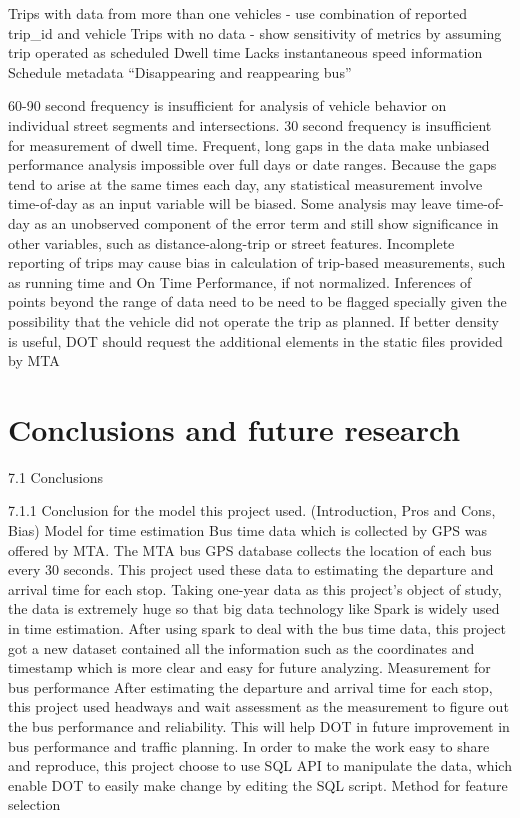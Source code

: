 \documentclass[12pt,journal,compsoc]{IEEEtran}
\begin{document}
Trips with data from more than one vehicles - use combination of reported trip\_id and vehicle
Trips with no data - show sensitivity of metrics by assuming trip operated as scheduled
Dwell time
Lacks instantaneous speed information
Schedule metadata
“Disappearing and reappearing bus” 

60-90 second frequency is insufficient for analysis of vehicle behavior on individual street segments and intersections.
30 second frequency is insufficient for measurement of dwell time.
Frequent, long gaps in the data make unbiased performance analysis impossible over full days or date ranges.  Because the gaps tend to arise at the same times each day, any statistical measurement involve time-of-day as an input variable will be biased.  Some analysis may leave time-of-day as an unobserved component of the error term and still show significance in other variables, such as distance-along-trip or street features.
Incomplete reporting of trips may cause bias in calculation of trip-based measurements, such as running time and On Time Performance, if not normalized.
Inferences of points beyond the range of data need to be need to be flagged specially given the possibility that the vehicle did not operate the trip as planned.
If better density is useful, DOT should request the additional elements in the static files provided by MTA


\section{Conclusions and future research}

7.1 Conclusions

7.1.1 Conclusion for the model this project used. (Introduction, Pros and Cons, Bias)
Model for time estimation
Bus time data which is collected by GPS was offered by MTA. The MTA bus GPS database collects the location of each bus every 30 seconds. This project used these data to estimating the departure and arrival time for each stop.
Taking one-year data as this project’s object of study, the data is extremely huge so that big data technology like Spark is widely used in time estimation.
After using spark to deal with the bus time data, this project got a new dataset contained all the information such as the coordinates and timestamp which is more clear and easy for future analyzing.
Measurement for bus performance
After estimating the departure and arrival time for each stop, this project used headways and wait assessment as the measurement to figure out the bus performance and reliability. This will help DOT in future improvement in bus performance and traffic planning.
 In order to make the work easy to share and reproduce, this project choose to use SQL API to manipulate the data, which enable DOT to easily make change by editing the SQL script. 
Method for feature selection
\end{document}
